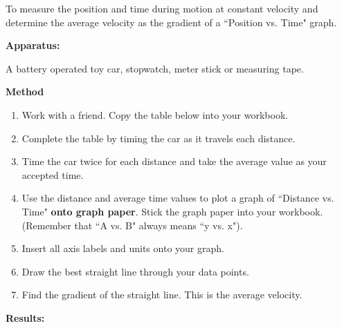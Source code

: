 To measure the position and time during motion at constant velocity and determine the average velocity as the gradient of a ``Position vs. Time" graph.\par 
        \label{m38795*id71286}\noindent{}\textbf{Apparatus:}
          
 A battery operated toy car, stopwatch, meter stick or measuring tape.\par 
        \label{m38795*id71301}\noindent{}\textbf{Method}


        \label{m38795*id71310}\begin{enumerate}[noitemsep, label=\textbf{\arabic*}. ] 
            \label{m38795*uid101}\item Work with a friend. Copy the table below into your workbook.
\label{m38795*uid102}\item Complete the table by timing the car as it travels each distance.
\label{m38795*uid103}\item Time the car twice for each distance and take the average value as your accepted time.
\label{m38795*uid104}\item Use the distance and average time values to plot a graph of ``Distance vs. Time" \textbf{onto graph paper}. Stick the graph paper into your workbook. (Remember that ``A vs. B" always means ``y vs. x").
\label{m38795*uid105}\item Insert all axis labels and units onto your graph.
\label{m38795*uid106}\item Draw the best straight line through your data points.
\label{m38795*uid107}\item Find the gradient of the straight line. This is the average velocity.
\end{enumerate}
        \par 
        \label{m38795*id71410}\noindent{}\textbf{Results:}
          
        
    
      
